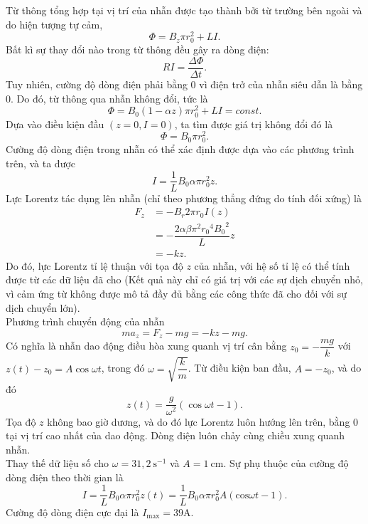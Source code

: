 \begin{loigiai}
Từ thông tổng hợp tại vị trí của nhẫn được tạo thành bởi từ trường bên ngoài và do hiện tượng tự cảm,
$$\Phi=B_z\pi r_0^2+LI.$$
Bất kì sự thay đổi nào trong từ thông đều gây ra dòng điện:
$$ RI=\dfrac{\Delta\Phi}{\Delta t}.$$
Tuy nhiên, cường độ dòng điện phải bằng $0$ vì điện trở của nhẫn siêu dẫn là bằng $0$. Do đó, từ thông qua nhẫn không đổi, tức là
$$\Phi=B_0\left(1-\alpha z\right)\pi r_0^2+LI=const.$$
Dựa vào điều kiện đầu $(z=0, I=0)$, ta tìm được giá trị không đổi đó là $$\Phi=B_0\pi r_0^2.$$
Cường độ dòng điện trong nhẫn có thể xác định được dựa vào các phương trình trên, và ta được
$$ I=\dfrac{1}{L}{B_0}\alpha\pi r_0^2z.$$
Lực Lorentz tác dụng lên nhẫn (chỉ theo phương thẳng đứng do tính đối xứng) là
\begin{equation*}
\begin{aligned}
F_z&=-B_r 2\pi{r_0}I(z)\\&=-\dfrac{2\alpha\beta\pi^2{r_0}^4{B_0}^2}{L}z
\\&=-kz.
\end{aligned}
\end{equation*}
Do đó, lực Lorentz tỉ lệ thuận với tọa độ $z$ của nhẫn, với hệ số tỉ lệ có thể tính được từ các dữ liệu đã cho (Kết quả này chỉ có giá trị với các sự dịch chuyển nhỏ, vì cảm ứng từ không được mô tả đầy đủ bằng các công thức đã cho đối với sự dịch chuyển lớn).\\
Phương trình chuyển động của nhẫn
$$ m{a_z}=F_z-mg=-kz-mg.$$
Có nghĩa là nhẫn dao động điều hòa xung quanh vị trí cân bằng $z_0=-\dfrac{mg}{k}$ với
$ z(t)-z_0=A\cos\omega t$,
trong đó $\omega=\sqrt{\dfrac{k}{m}}$. Từ điều kiện ban đầu, $ A=-z_{0}$, và do đó
$$ z(t)=\dfrac{g}{\omega^2}\left(\cos\omega t-1\right).$$
Tọa độ $z$ không bao giờ dương, và do đó lực Lorentz luôn hướng lên trên, bằng $0$ tại vị trí cao nhất của dao động. Dòng điện luôn chảy cùng chiều xung quanh nhẫn.\\
Thay thế dữ liệu số cho $\omega=31,2\ \mathrm{s^{-1}}$ và $ A=1\ \mathrm{cm}$. Sự phụ thuộc của cường độ dòng điện theo thời gian là
$$ I=\dfrac{1}{L}{B_0}\alpha\pi r_0^2z(t)=\dfrac{1}{L}{B_0}\alpha\pi r_0^2A\left(\mathrm{cos}\omega t-1\right).$$
Cường độ dòng điện cực đại là $I_{\max}=39\mathrm{A}$.
\end{loigiai}



